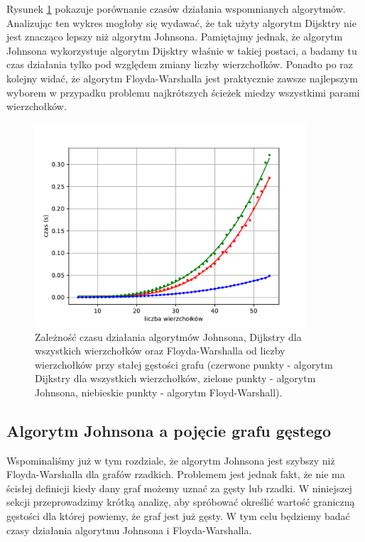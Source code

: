 \documentclass[12pt,a4paper]{book}
\theoremstyle{definition}
\numberwithin{equation}{chapter}
\begin{document}
Rysunek \ref{rys_wykres_dijkstra_all_johnson} pokazuje porównanie czasów działania wspomnianych algorytmów. Analizując ten wykres mogłoby się wydawać, że tak użyty algorytm Dijsktry nie jest znacząco lepszy niż algorytm Johnsona. Pamiętajmy jednak, że algorytm Johnsona wykorzystuje algorytm Dijsktry właśnie w takiej postaci, a badamy tu czas działania tylko pod względem zmiany liczby wierzchołków. Ponadto po raz kolejny widać, że algorytm Floyda-Warshalla jest praktycznie zawsze najlepszym wyborem w przypadku problemu najkrótszych ścieżek miedzy wszystkimi parami wierzchołków. 

\begin{figure}[H]
\centering
\includegraphics[width=0.9\textwidth]{images/Wykres_Dijkstra_all_vs_Johnson.pdf}
\caption{Zależność czasu działania algorytmów Johnsona, Dijkstry dla wszystkich wierzchołków oraz Floyda-Warshalla od liczby wierzchołków przy stałej gęstości grafu (czerwone punkty - algorytm Dijkstry dla wszystkich wierzchołków, zielone punkty - algorytm Johnsona, niebieskie punkty - algorytm Floyd-Warshall).}
\label{rys_wykres_dijkstra_all_johnson}
\end{figure}

\subsection*{Algorytm Johnsona a pojęcie grafu gęstego}

Wspominaliśmy już w tym rozdziale, że algorytm Johnsona jest szybszy niż Floyda-Warshalla dla grafów rzadkich. Problemem jest jednak fakt, że nie ma ścisłej definicji kiedy dany graf możemy uznać za gęsty lub rzadki. W niniejszej sekcji przeprowadzimy krótką analizę, aby spróbować określić wartość graniczną gęstości dla której powiemy, że graf jest już gęsty.  W tym celu będziemy badać czasy działania algorytmu Johnsona i Floyda-Warshalla.
\end{document}
